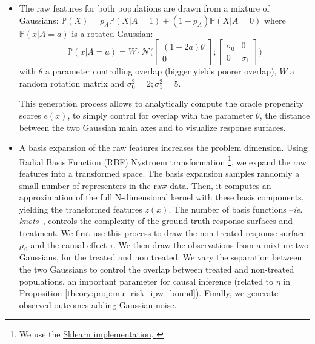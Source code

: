 \documentclass[10pt,twocolumn]{article}
\begin{document}
\begin{itemize}
    \item The raw features for both populations are drawn from a mixture of
          Gaussians:
          $\mathbb P(X) = p_A \mathbb P(X|A=1) + (1- p_A) \mathbb P(X|A=0)$
          where $\mathbb P(x|A=a)$ is a rotated Gaussian:
          \begin{equation}
              \mathbb P(x|A=a) = W \cdot \mathcal N \Big( \begin{bmatrix} (1-2a) \theta \\ 0\end{bmatrix} ; \begin{bmatrix} \sigma_0 & 0 \\ 0 & \sigma_1\end{bmatrix} \Big)
          \end{equation}
          with $\theta$ a parameter controlling overlap (bigger yields poorer
          overlap), $W$ a random rotation matrix and $\sigma_0^2=2;\sigma_1^2=5$.

          This generation process allows to analytically compute the oracle
          propensity scores $e(x)$, to simply control for overlap with the
          parameter $\theta$, the distance between the two Gaussian main axes and
          to  visualize response surfaces.

    \item A basis expansion of the raw features increases the problem dimension.
          Using Radial Basis Function (RBF) Nystroem transformation \footnote{We
              use the
              \href{https://scikit-learn.org/stable/modules/generated/sklearn.kernel_approximation.Nystroem.html}{Sklearn
                  implementation, \cite{pedregosa_scikitlearn_2011}}}, we expand the raw
          features into a transformed space. The basis expansion samples
          randomly a small number of representers in the raw data. Then,  it
          computes an approximation of the full N-dimensional kernel with these
          basis components, yielding the transformed features $z(x)$. The number
          of basis functions --\emph{ie. knots}--, controls the complexity of
          the ground-truth response surfaces and treatment. We first use this
          process to draw the non-treated response surface $\mu_0$ and the
          causal effect $\tau$. We then draw the observations from a mixture two
          Gaussians, for the treated and non treated. We vary the separation
          between the two Gaussians to control the overlap between treated and
          non-treated populations, an important parameter for causal inference
          (related to $\eta$ in Proposition
          \ref{theory:prop:mu_risk_ipw_bound}). Finally, we generate observed
          outcomes adding Gaussian noise.


\end{itemize}
\end{document}
